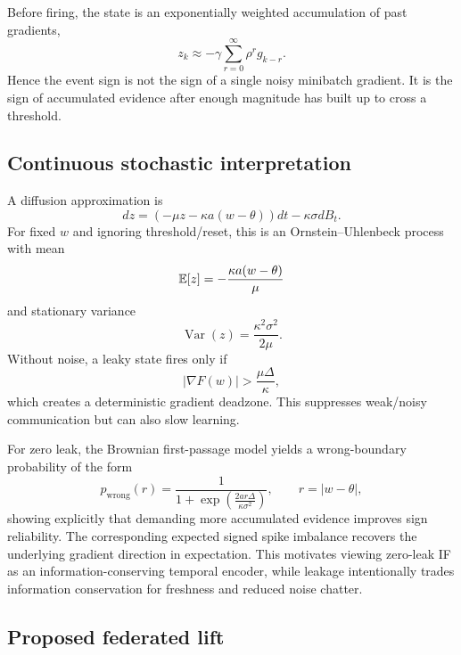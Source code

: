 Before firing, the state is an exponentially weighted accumulation of past gradients,
\begin{equation}
  z_k\approx-\gamma\sum_{r=0}^{\infty}\rho^r g_{k-r}.
\end{equation}
Hence the event sign is not the sign of a single noisy minibatch gradient. It is the sign of accumulated evidence after enough magnitude has built up to cross a threshold.

\subsection{Continuous stochastic interpretation}

A diffusion approximation is
\begin{equation}
  dz=(-\mu z-\kappa a(w-\theta))dt-\kappa\sigma dB_t.
\end{equation}
For fixed $w$ and ignoring threshold/reset, this is an Ornstein--Uhlenbeck process with mean
\begin{equation}
  \mathbb{E}[z]=-\frac{\kappa a(w-\theta)}{\mu}
\end{equation}
and stationary variance
\begin{equation}
  \operatorname{Var}(z)=\frac{\kappa^2\sigma^2}{2\mu}.
\end{equation}
Without noise, a leaky state fires only if
\begin{equation}
  |\nabla F(w)|>\frac{\mu\Delta}{\kappa},
\end{equation}
which creates a deterministic gradient deadzone. This suppresses weak/noisy communication but can also slow learning.

For zero leak, the Brownian first-passage model yields a wrong-boundary probability of the form
\begin{equation}
  p_{\mathrm{wrong}}(r)=\frac{1}{1+\exp\!\left(\frac{2ar\Delta}{\kappa\sigma^2}\right)},
  \qquad r=|w-\theta|,
\end{equation}
showing explicitly that demanding more accumulated evidence improves sign reliability. The corresponding expected signed spike imbalance recovers the underlying gradient direction in expectation. This motivates viewing zero-leak IF as an information-conserving temporal encoder, while leakage intentionally trades information conservation for freshness and reduced noise chatter.

\subsection{Proposed federated lift}

